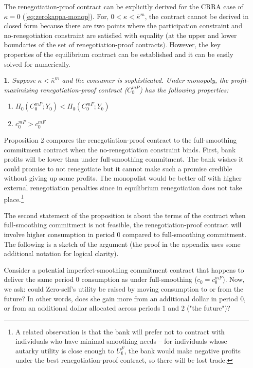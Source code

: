 \documentclass[11pt,english]{article}
\theoremstyle{plain}
\newtheorem{prop}{\protect\propositionname}
\theoremstyle{definition}
\providecommand{\propositionname}{Proposition}
\begin{document}
The renegotiation-proof contract can be explicitly derived for the
CRRA case of $\kappa=0$ (\ref{eq:zerokappa-monop}). For,
$0<\kappa<\bar{\kappa}^{m}$, the contract cannot be derived in closed
form because there are two points where the participation constraint
and no-renegotiation constraint are satisfied with equality (at the
upper and lower boundaries of the set of renegotiation-proof contracts).
However, the key properties of the equilibrium contract can be established
and it can be easily solved for numerically.
\begin{prop}
Suppose $\kappa<\bar{\kappa}^{m}$ and the consumer is sophisticated.
Under monopoly, the profit-maximizing renegotiation-proof contract
($C_{0}^{mP}$) has the following properties:
\begin{enumerate} [label=\alph*)]
\item $\Pi_{0}\left(C_{0}^{mP};Y_{0}\right)<\Pi_{0}\left(C_{0}^{mF};Y_{0}\right)$

\item $c_{0}^{mP}>c_{0}^{mF}$ 
\end{enumerate}
\end{prop}
Proposition 2 compares the renegotiation-proof contract to the full-smoothing
commitment contract when the no-renegotiation constraint binds.
First, bank profits will be lower than under full-smoothing commitment.
The bank wishes it could promise to not renegotiate but it cannot
make such a promise credible without giving up some profits. The monopolist
would be better off with higher external renegotiation penalties since
in equilibrium renegotiation does not take place.\footnote{A related observation is that the bank will prefer not to contract
with individuals who have minimal smoothing needs -- for individuals
whose autarky utility is close enough to $U_{0}^{F}$, the bank would
make negative profits under the best renegotiation-proof contract,
so there will be lost trade.}

The second statement of the proposition is about the terms of the
contract \textendash{} when full-smoothing commitment is not feasible,
the renegotiation-proof contract will involve higher consumption in
period 0 compared to
full-smoothing commitment. The following is a sketch of the argument
(the proof in the appendix uses some additional notation for logical
clarity).

Consider a potential imperfect-smoothing commitment contract that happens to deliver the same period 0 consumption as under full-smoothing ($c_{0}=c_{0}^{mF}$). Now, we ask: could Zero-self's utility be raised by moving consumption to or from the future? In other words, does she gain more from an additional dollar in period 0, or from an additional dollar allocated across periods 1 and 2 ("the future")? 
\end{document}
